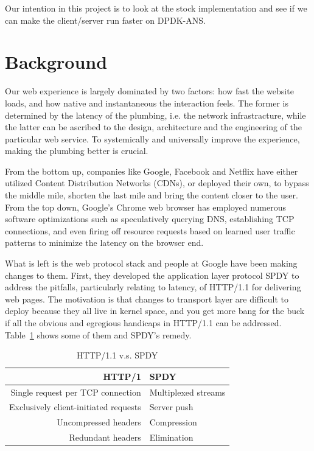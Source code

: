 \documentclass{sig-alternate-05-2015}
\begin{document}
Our intention in this project is to look at the stock implementation and see if we can make the client/server run faster on DPDK-ANS.

\section{Background}
Our web experience is largely dominated by two factors: how fast the website loads, and how native and instantaneous the interaction feels. The former is determined by the latency of the plumbing, i.e. the network infrastracture, while the latter can be ascribed to the design, architecture and the engineering of the particular web service. To systemically and universally improve the experience, making the plumbing better is crucial. 

From the bottom up, companies like Google, Facebook and Netflix have either utilized Content Distribution Networks (CDNs), or deployed their own, to bypass the middle mile, shorten the last mile and bring the content closer to the user. From the top down, Google's Chrome web browser has employed numerous software optimizations such as speculatively querying DNS, establishing TCP connections, and even firing off resource requests based on learned user traffic patterns to minimize the latency on the browser end.\cite{grigorik:chrome} 

What is left is the web protocol stack and people at Google have been making changes to them. First, they developed the application layer protocol SPDY to address the pitfalls, particularly relating to latency, of HTTP/1.1 for delivering web pages. The motivation is that changes to transport layer are difficult to deploy because they all live in kernel space, and you get more bang for the buck if all the obvious and egregious handicaps in HTTP/1.1 can be addressed. Table~\ref{tab:httpvspdy} shows some of them and SPDY's remedy.

\vspace*{-10pt}
\begin{table}[h]
\centering
\caption{HTTP/1.1 v.s. SPDY\cite{spdy}}
\label{tab:httpvspdy}
\begin{tabular}{|r|l|}
\hline
HTTP/1 & SPDY \\ \hline
Single request per TCP connection & Multiplexed streams \\ \hline
Exclusively client-initiated requests & Server push \\ \hline
Uncompressed headers & Compression \\ \hline
Redundant headers & Elimination \\ \hline
\end{tabular}
\end{table}
\end{document}
